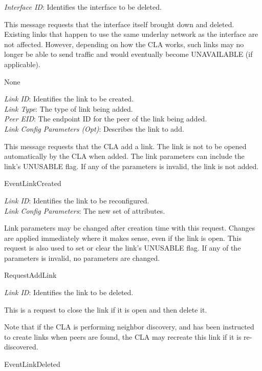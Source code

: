 {
\metP
    {\em Interface ID}: Identifies the interface to be deleted.

\metD
    This message requests that the interface itself brought down and
    deleted. Existing links that happen to use the same underlay network
    as the interface are not affected. However, depending on how the CLA
    works, such links may no longer be able to send traffic and would
    eventually become UNAVAILABLE (if applicable).

\metR
    None
}

{
\metP
    {\em Link ID}: Identifies the link to be created.\\
    {\em Link Type}: The type of link being added.\\
    {\em Peer EID}: The endpoint ID for the peer of the link being added.\\
    {\em Link Config Parameters (Opt)}: Describes the link to add.

\metD
    This message requests that the CLA add a link. The link is not to be
    opened automatically by the CLA when added.
The link parameters can include the link's UNUSABLE flag.
    If any of the parameters is invalid, the link is not added.

\metR
    EventLinkCreated
}

{
\metP
    {\em Link ID}: Identifies the link to be reconfigured.\\
    {\em Link Config Parameters}: The new set of attributes.

\metD
    Link parameters may be changed after creation time with this
    request. Changes are applied immediately where it makes sense, even if the
    link is open. This request is also used to set or clear the link's
    UNUSABLE flag. If any of the parameters is invalid, no parameters are
    changed.

\metR
    RequestAddLink
}

{
\metP
    {\em Link ID}: Identifies the link to be deleted.

\metD
    This is a request to close the link if it is open and then delete it.

    Note that if the CLA is performing neighbor discovery, and has been
    instructed to create links when peers are found, the CLA may recreate
    this link if it is re-discovered.

\metR
    EventLinkDeleted
}

